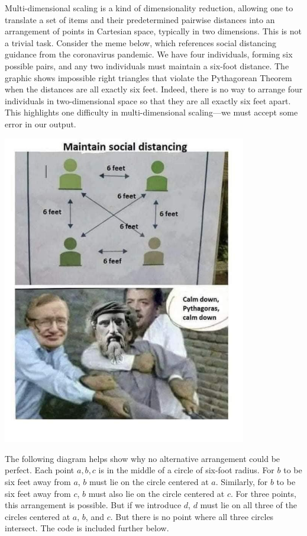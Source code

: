 
Multi-dimensional scaling is a kind of dimensionality reduction, allowing one to translate a set of items and their predetermined pairwise distances into an arrangement of points in Cartesian space, typically in two dimensions. This is not a trivial task. Consider the meme below, which references social distancing guidance from the coronavirus pandemic. We have four individuals, forming six possible pairs, and any two individuals must maintain a six-foot distance. The graphic shows impossible right triangles that violate the Pythagorean Theorem when the distances are all exactly six feet. Indeed, there is no way to arrange four individuals in two-dimensional space so that they are all exactly six feet apart. This highlights one difficulty in multi-dimensional scaling---we must accept some error in our output. 

\begin{center}
    \includegraphics[width = 0.8\textwidth]{Images/calmdownpythag.jpg}
\end{center}

\vspace{-2cm}

The following diagram helps show why no alternative arrangement could be perfect. Each point $a,b,c$ is in the middle of a circle of six-foot radius. For $b$ to be six feet away from $a$, $b$ must lie on the circle centered at $a$. Similarly, for $b$ to be six feet away from $c$, $b$ must also lie on the circle centered at $c$. For three points, this arrangement is possible. But if we introduce $d$, $d$ must lie on all three of the circles centered at $a$, $b$, and $c$. But there is no point where all three circles intersect. The code is included further below. 

